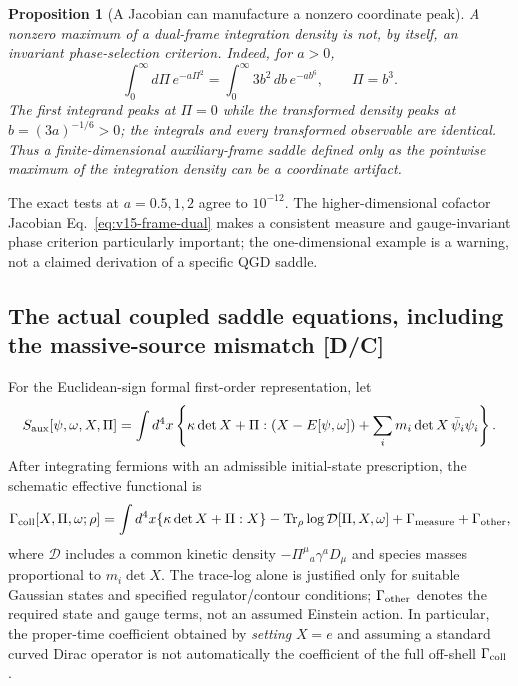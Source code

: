 \documentclass[11pt,a4paper]{article}
\newtheorem{proposition}{Proposition}[section]\newtheorem{lemma}[proposition]{Lemma}\newtheorem{definition}[proposition]{Definition}\newtheorem{remark}[proposition]{Remark}
\begin{document}
\begin{proposition}[A Jacobian can manufacture a nonzero coordinate peak]\label{prop:v15-coordinatepeak}
A nonzero maximum of a dual-frame integration density is not, by itself, an invariant phase-selection criterion. Indeed, for $a>0$,
\begin{equation}\label{eq:v15-peak}
\int_0^\infty d\Pi\,e^{-a\Pi^2}
=\int_0^\infty 3b^2\,db\,e^{-ab^6},\qquad \Pi=b^3.
\end{equation}
The first integrand peaks at $\Pi=0$ while the transformed density peaks at $b=(3a)^{-1/6}>0$; the integrals and every transformed observable are identical. Thus a finite-dimensional auxiliary-frame saddle defined only as the pointwise maximum of the integration density can be a coordinate artifact.
\end{proposition}
The exact tests at $a=0.5,1,2$ agree to $10^{-12}$. The higher-dimensional cofactor Jacobian Eq.~\eqref{eq:v15-frame-dual} makes a consistent measure and gauge-invariant phase criterion particularly important; the one-dimensional example is a warning, not a claimed derivation of a specific QGD saddle.

\subsection{The actual coupled saddle equations, including the massive-source mismatch [D/C]}
\label{sec:v15-saddles}
For the Euclidean-sign formal first-order representation, let
\begin{equation}\label{eq:v15-aux}
S_{\rm aux}[\psi,\omega,X,\Pi]
=\int d^4x\left\{\kappa\det X+\Pi:(X-E[\psi,\omega])
+\sum_i m_i\det X\,\bar\psi_i\psi_i\right\}.
\end{equation}
After integrating fermions with an admissible initial-state prescription, the schematic effective functional is
\begin{equation}\label{eq:v15-Gamma}
\Gamma_{\rm coll}[X,\Pi,\omega;\rho]
=\int d^4x\{\kappa\det X+\Pi:X\}-\operatorname{Tr}_{\rho}\log\mathcal D[\Pi,X,\omega]
+\Gamma_{\rm measure}+\Gamma_{\rm other},
\end{equation}
where $\mathcal D$ includes a common kinetic density $-\Pi^\mu{}_a\gamma^aD_\mu$ and species masses proportional to $m_i\det X$. The trace-log alone is justified only for suitable Gaussian states and specified regulator/contour conditions; $\Gamma_{\rm other}$ denotes the required state and gauge terms, not an assumed Einstein action. In particular, the proper-time coefficient obtained by \emph{setting} $X=e$ and assuming a standard curved Dirac operator is not automatically the coefficient of the full off-shell $\Gamma_{\rm coll}$.
\end{document}
